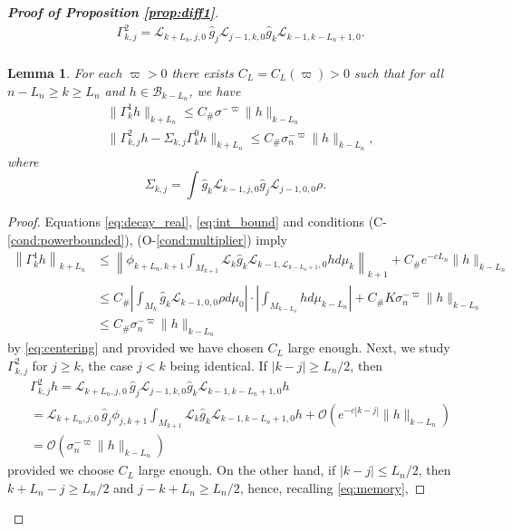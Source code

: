 \documentclass{amsart}
\numberwithin{equation}{section}
\newtheorem{lem}[thm]{Lemma}
\newcommand\cB{{\mathcal B}}
\newcommand\cL{{\mathcal L}}
\newcommand\cO{{\mathcal O}}
\newcommand{\Const}{C_{\#}}
\begin{document}
\begin{proof}[\bf \em Proof of Proposition \ref{prop:diff1}]
\begin{equation}
\begin{split}
& \Gamma^2_{k,j}=\cL_{k+L_n, j,0}\,\hat g_j\cL_{j-1,k,0}\hat g_k\cL_{k-1,k-L_n+1,0}.\\
\end{split}
\end{equation}
\begin{lem}\label{lem:gamma_est}
For each $\varpi>0$ there exists $C_L=C_L(\varpi)>0$ such that for all $n-L_n\geq k\geq L_n$ and $h\in\cB_{k-L_n}$, we have
\[
\begin{split}
&\|\Gamma^1_{k}h\|_{k+L_n}\leq \Const \sigma^{-\varpi}\|h\|_{k-L_n}\\
&\|\Gamma^2_{k,j}h- \Sigma_{k, j}\Gamma_k^0h\|_{k+L_n}\leq\Const \sigma_n^{-\varpi}\|h\|_{k-L_n},
\end{split}
\]
where
\begin{equation}\label{eq:variance}
\Sigma_{k,j}=\int \hat g_{k}\cL_{k-1,j,0}\hat g_j\cL_{j-1,0,0}\rho.
\end{equation}
\end{lem}
\begin{proof}
Equations \eqref{eq:decay_real}, \eqref{eq:int_bound} and conditions (C-\ref{cond:powerbounded}), (O-\ref{cond:multiplier}) imply
\[
\begin{split}
\left\|\Gamma^1_{k}h\right\|_{k+L_n}&\leq \left\|\phi_{k+L_n,k+1}\int_{M_{k+1}}\cL_{k}\hat g_k\cL_{k-1, \cL_{k-L_n +1 },0}hd\mu_k\right\|_{k+1}+ \Const e^{-c L_n}\|h\|_{k-L_n}\\
&\leq \Const \left|\int_{M_k}\hat g_k\cL_{k-1, 0,0}\rho d\mu_0\right|\cdot\left| \int_{M_{k-L_n}} h d\mu_{k-L_n}\right|+\Const K\sigma_n^{-\varpi}\|h\|_{k-L_n}\\
&\leq \Const \sigma_n^{-\varpi}\|h\|_{k-L_n}
\end{split}
\]
by \eqref{eq:centering} and provided we have chosen $C_L$ large enough. Next, we study $\Gamma^2_{k,j}$ for $j\geq k$, the case $j<k$ being identical. If $|k-j|\geq L_n/2$, then
\begin{equation}\label{eq:gamma1}
\begin{split}
&\Gamma^2_{k,j}h=\cL_{k+L_n, j,0}\,\hat g_j\cL_{j-1,k,0}\hat g_k\cL_{k-1,k-L_n+1,0}h\\
&=\cL_{k+L_n, j,0}\,\hat g_j\phi_{j,k+1}\int_{M_{k+1}}\cL_{k}\hat g_k\cL_{k-1,k-L_n+1,0}h+\cO(e^{-c|k-j|}\|h\|_{k-L_n})\\
&=\cO(\sigma_n^{-\varpi}\|h\|_{k-L_n})
\end{split}
\end{equation}
provided we choose $C_L$ large enough. On the other hand, if $|k-j|\leq L_n/2$, then $k+L_n-j\geq L_n/2 $ and $j-k+L_n\geq L_n/2$, hence, recalling \eqref{eq:memory},

\end{proof}
\end{proof}
\end{document}
